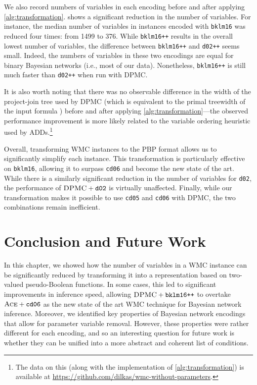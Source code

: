 We also record numbers of variables in each encoding before and after applying
\cref{alg:transformation}.  shows a significant reduction in the
number of variables. For instance, the median number of variables in instances
encoded with \texttt{bklm16} was reduced four times: from 1499 to 376. While
\texttt{bklm16++} results in the overall lowest number of variables, the
difference between \texttt{bklm16++} and \texttt{d02++} seems small. Indeed, the
numbers of variables in these two encodings are equal for binary Bayesian
networks (i.e., most of our data). Nonetheless, \texttt{bklm16++} is still much
faster than \texttt{d02++} when run with \textsc{DPMC}.

It is also worth noting that there was no observable difference in the width of
the project-join tree used by \textsc{DPMC} (which is equivalent to the primal
treewidth of the input formula \citep{DBLP:conf/cp/DudekPV20}) before and after
applying \cref{alg:transformation}---the observed performance improvement is
more likely related to the variable ordering heuristic used by
ADDs.\footnote{The data on this (along with the implementation of
  \cref{alg:transformation}) is available at
  \url{https://github.com/dilkas/wmc-without-parameters}.}

Overall, transforming WMC instances to the PBP format allows us to significantly
simplify each instance. This transformation is particularly effective on
\texttt{bklm16}, allowing it to surpass \texttt{cd06} and become the new state
of the art. While there is a similarly significant reduction in the number of
variables for \texttt{d02}, the performance of $\textsc{DPMC}+\texttt{d02}$ is
virtually unaffected. Finally, while our transformation makes it possible to use
\texttt{cd05} and \texttt{cd06} with \textsc{DPMC}, the two combinations remain
inefficient.

\section{Conclusion and Future Work}

In this chapter, we showed how the number of variables in a WMC instance can be
significantly reduced by transforming it into a representation based on
two-valued pseudo-Boolean functions. In some cases, this led to significant
improvements in inference speed, allowing $\textsc{DPMC} + \texttt{bklm16++}$ to
overtake $\textsc{Ace}+\texttt{cd06}$ as the new state of the art WMC technique
for Bayesian network inference. Moreover, we identified key properties of
Bayesian network encodings that allow for parameter variable removal. However,
these properties were rather different for each encoding, and so an interesting
question for future work is whether they can be unified into a more abstract and
coherent list of conditions.

